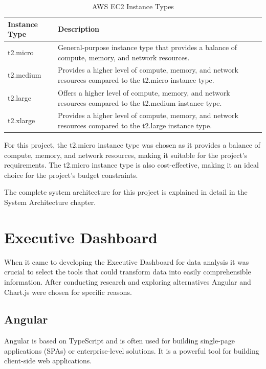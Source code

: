 \begin{table}[H]
    \centering
    \begin{tabularx}{\textwidth}{|l|X|}
        \hline
        \textbf{Instance Type} & \textbf{Description}                                                                                                      \\
        \hline
        t2.micro              & General-purpose instance type that provides a balance of compute, memory, and network resources.                             \\
        \hline
        t2.medium             & Provides a higher level of compute, memory, and network resources compared to the t2.micro instance type.                   \\
        \hline
        t2.large              & Offers a higher level of compute, memory, and network resources compared to the t2.medium instance type.                     \\
        \hline
        t2.xlarge             & Provides a higher level of compute, memory, and network resources compared to the t2.large instance type.                    \\
        \hline
    \end{tabularx}
    \label{tab:aws-instances}
    \caption{AWS EC2 Instance Types}

\end{table}

For this project, the t2.micro instance type was chosen as it provides a balance of compute, memory, and network resources, making it suitable for the project's
requirements. The t2.micro instance type is also cost-effective, making it an ideal choice for the project's budget constraints.

The complete system architecture for this project is explained in detail in the System Architecture chapter.

\section{Executive Dashboard}
When it came to developing the Executive Dashboard for data analysis it was crucial to select the tools that could transform data into easily comprehensible information. After conducting research and exploring alternatives Angular and Chart.js were chosen for specific reasons.

\subsection{Angular}
Angular is based on TypeScript and is often used for building single-page applications (SPAs) or enterprise-level solutions. It is a powerful tool for building
client-side web applications.

